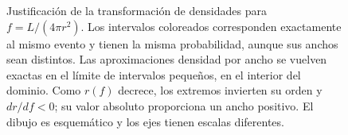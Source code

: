 \begin{figure}[H]
\shorthandon{<>}
\caption{Justificación de la transformación de densidades para $f=L/(4\pi r^2)$. Los intervalos coloreados corresponden exactamente al mismo evento y tienen la misma probabilidad, aunque sus anchos sean distintos. Las aproximaciones densidad por ancho se vuelven exactas en el límite de intervalos pequeños, en el interior del dominio. Como $r(f)$ decrece, los extremos invierten su orden y $dr/df<0$; su valor absoluto proporciona un ancho positivo. El dibujo es esquemático y los ejes tienen escalas diferentes.}
\label{fig:transformacion-jacobiano}
\end{figure}

